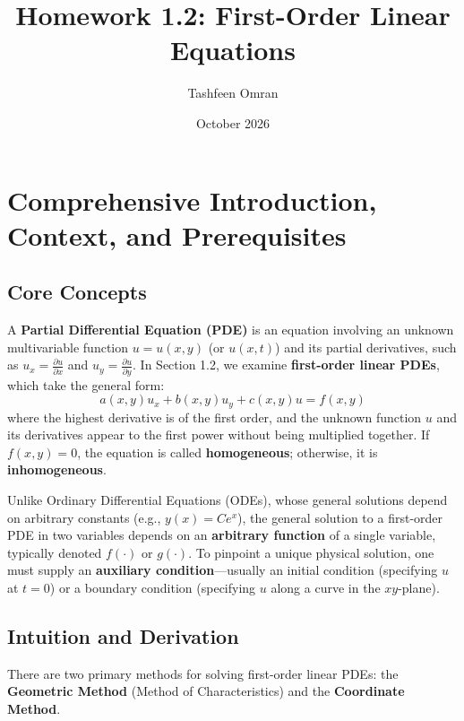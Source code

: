 \documentclass[11pt]{article}
\title{\textbf{Homework 1.2: First-Order Linear Equations}}
\author{Tashfeen Omran}
\date{October 2026}
\begin{document}
\maketitle
\tableofcontents
\newpage

\section{Comprehensive Introduction, Context, and Prerequisites}

\subsection{Core Concepts}
A \textbf{Partial Differential Equation (PDE)} is an equation involving an unknown multivariable function $u = u(x, y)$ (or $u(x, t)$) and its partial derivatives, such as $u_x = \frac{\partial u}{\partial x}$ and $u_y = \frac{\partial u}{\partial y}$. In Section 1.2, we examine \textbf{first-order linear PDEs}, which take the general form:
\[
a(x, y)u_x + b(x, y)u_y + c(x, y)u = f(x, y)
\]
where the highest derivative is of the first order, and the unknown function $u$ and its derivatives appear to the first power without being multiplied together. If $f(x, y) = 0$, the equation is called \textbf{homogeneous}; otherwise, it is \textbf{inhomogeneous}.

Unlike Ordinary Differential Equations (ODEs), whose general solutions depend on arbitrary constants (e.g., $y(x) = Ce^x$), the general solution to a first-order PDE in two variables depends on an \textbf{arbitrary function} of a single variable, typically denoted $f(\cdot)$ or $g(\cdot)$. To pinpoint a unique physical solution, one must supply an \textbf{auxiliary condition}—usually an initial condition (specifying $u$ at $t=0$) or a boundary condition (specifying $u$ along a curve in the $xy$-plane).

\subsection{Intuition and Derivation}
There are two primary methods for solving first-order linear PDEs: the \textbf{Geometric Method} (Method of Characteristics) and the \textbf{Coordinate Method}.
\end{document}
